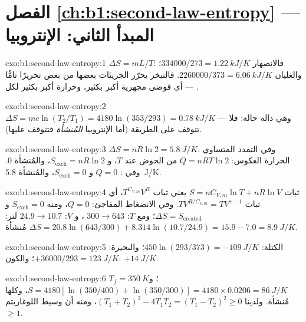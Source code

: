 \section*{الفصل \ref{ch:b1:second-law-entropy} --- المبدأ الثاني: الإنتروبيا}

\begin{solution}{exo:b1:second-law-entropy:1}
$\Delta S = mL/T$: فالانصهار $334000/273 = \qty{1.22}{kJ/K}$؛ والغليان $2260000/
373 = \qty{6.06}{kJ/K}$. فالتبخر يحرّر الجزيئات بعضها من بعض
تحريرًا تامًّا --- أي فوضى مجهرية أكبر بكثير، وحرارة أكبر بكثير لكل
.
\end{solution}

\begin{solution}{exo:b1:second-law-entropy:2}
$\Delta S = mc\ln(T_2/T_1) = 4180\ln(353/293) = \qty{0.78}{kJ/K}$ --- وهي دالة
حالة: فلا تتوقف على الطريقة (أما الإنتروبيا \emph{المُنشأة} فتتوقف عليها).
\end{solution}

\begin{solution}{exo:b1:second-law-entropy:3}
$\Delta S = nR\ln2 = \qty{5.8}{J/K}$. وفي التمدد المتساوي الحرارة العكوس: $Q = nRT\ln2$
من الحوض عند $T$، و $S_{\mathrm{exch}} = nR\ln2$، والمُنشأة $0$. وفي :
$Q = 0$ و $S_{\mathrm{exch}} = 0$، والمُنشأة \qty{5.8}{J/K}.
\end{solution}

\begin{solution}{exo:b1:second-law-entropy:4}
ثبات $S = nC_{V,m}\ln T + nR\ln V$ يعني ثبات $T^{C_{V,m}}V^R$، أي
ثبات $TV^{R/C_{V,m}} = TV^{\gamma - 1}$. وفي الانضغاط المفاجئ: $Q = 0$، ومنه
$S_{\mathrm{exch}} = 0$ و $\Delta S = S_{\mathrm{created}}$؛ ومع $T$: $300 \to
643$ ، و $V$: $24.9 \to 10.7$ لتر: $\Delta S = 20.8\ln(643/300) + 8.314\ln(10.7/
24.9) = 15.9 - 7.0 = \qty{+8.9}{J/K}$ مُنشأة.
\end{solution}

\begin{solution}{exo:b1:second-law-entropy:5}
الكتلة: $450\ln(293/373) = \qty{-109}{J/K}$؛ والبحيرة: $+36000/293 = \qty{+123}{J/K}$؛
والكون: $+\qty{14}{J/K}$.
\end{solution}

\begin{solution}{exo:b1:second-law-entropy:6}
$T_f = \qty{350}{K}$؛ و $S = 4180[\ln(350/400) + \ln(350/300)] = 4180 \times
0.0206 = \qty{86}{J/K}$، وكلها مُنشأة. ولدينا $(T_1 + T_2)^2 - 4T_1T_2 = (T_1 - T_2)^2
\geq 0$، ومنه أن وسيط اللوغاريتم $\geq 1$.
\end{solution}

